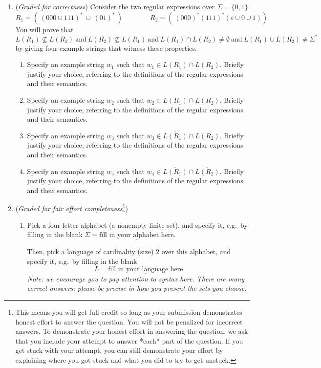 \begin{enumerate}
\item ({\it Graded for correctness})
Consider the two regular expressions over $\Sigma = \{ 0, 1 \}$
\[
R_1 = (~(000 \cup 111)^* ~\cup~ (01)^*~)
\qquad \qquad
R_2 = (~(000)^*(111)^* (\varepsilon \cup 0\cup1))
\]
You will prove that 
\[
L(R_1) \not \subseteq L(R_2) ~ \text{and} ~ L(R_2) \not \subseteq L(R_1)  
~ \text{and} ~ L(R_1) \cap L(R_2)  \neq \emptyset
~ \text{and} ~ L(R_1) \cup L(R_2)  \neq \Sigma^*
\]
by giving four example strings that witness these properties.
\begin{enumerate}
\item Specify an example string $w_1$ such that $w_1 \in L(R_1) \cap L(R_2)$.
 Briefly justify your choice, referring to the definitions of the regular expressions and their semantics.
\item Specify an example string $w_2$ such that $w_2 \in L(R_1) \cap \overline{L(R_2)}$.
Briefly justify your choice, referring to the definitions of the regular expressions and their semantics.
\item Specify an example string $w_3$ such that $w_3 \in \overline{L(R_1)} \cap L(R_2)$.
Briefly justify your choice, referring to the definitions of the regular expressions and their semantics.
\item Specify an example string $w_4$ such that $w_4 \in \overline{L(R_1)} \cap \overline{L(R_2)}$.
Briefly justify your choice, referring to the definitions of the regular expressions and their semantics.
\end{enumerate}


\item  ({\it Graded for fair effort completeness}\footnote{This means 
you will get full credit so long as your submission demonstrates honest 
effort to answer the question. You will not be penalized for incorrect answers. 
To demonstrate your honest effort in answering the question, we ask that you 
include your attempt to answer *each* part of the question. If you get stuck 
with your attempt, you can still demonstrate your effort by explaining where 
you got stuck and what you did to try to get unstuck. }) 
\begin{enumerate}
\item Pick a four letter alphabet (a nonempty finite set), and specify it, e.g.\ by filling in the blank 
$\Sigma =  \underline{\text{fill in your alphabet here}}$.

Then, pick a language of cardinality (size) $2$ over this alphabet, and specify it, e.g.\ by filling in the blank
\[
L =  \underline{\text{fill in your language here}}
\]
{\it Note: we encourage you to pay attention to syntax here.  There are many correct answers; please be 
precise in how you present the sets you choose.}


\end{enumerate}
\end{enumerate}
